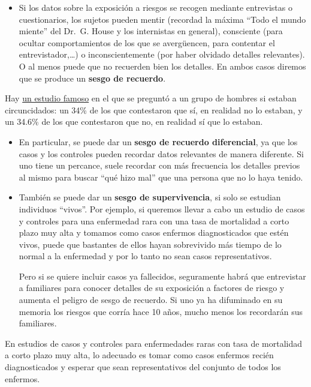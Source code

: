 \documentclass[
]{book}
\providecommand{\tightlist}{%
  \setlength{\itemsep}{0pt}\setlength{\parskip}{0pt}}
\theoremstyle{definition}
\theoremstyle{definition}
\theoremstyle{definition}
\theoremstyle{definition}
\theoremstyle{remark}
\begin{document}
\begin{itemize}
\tightlist
\item
  Si los datos sobre la exposición a riesgos se recogen mediante entrevistas o cuestionarios, los sujetos pueden mentir (recordad la máxima ``Todo el mundo miente'' del Dr.~G. House y los internistas en general), consciente (para ocultar comportamientos de los que se avergüencen, para contentar el entrevistador,\ldots) o inconscientemente (por haber olvidado detalles relevantes). O al menos puede que no recuerden bien los detalles. En ambos casos diremos que se produce un \textbf{sesgo de recuerdo}.
\end{itemize}

\begin{rmdromans}
Hay \href{https://academic.oup.com/jnci/article-abstract/21/4/713/869173}{un estudio famoso} en el que se preguntó a un grupo de hombres si estaban circuncidados: un 34\% de los que contestaron que sí, en realidad no lo estaban, y un 34.6\% de los que contestaron que no, en realidad sí que lo estaban.
\end{rmdromans}

\begin{itemize}
\item
  En particular, se puede dar un \textbf{sesgo de recuerdo diferencial}, ya que los casos y los controles pueden recordar datos relevantes de manera diferente. Si uno tiene un percance, suele recordar con más frecuencia los detalles previos al mismo para buscar ``qué hizo mal'' que una persona que no lo haya tenido.
\item
  También se puede dar un \textbf{sesgo de supervivencia}, si solo se estudian individuos ``vivos''. Por ejemplo, si queremos llevar a cabo un estudio de casos y controles para una enfermedad rara con una tasa de mortalidad a corto plazo muy alta y tomamos como casos enfermos diagnosticados que estén vivos, puede que bastantes de ellos hayan sobrevivido más tiempo de lo normal a la enfermedad y por lo tanto no sean casos representativos.

  Pero si se quiere incluir casos ya fallecidos, seguramente habrá que entrevistar a familiares para conocer detalles de su exposición a factores de riesgo y aumenta el peligro de sesgo de recuerdo. Si uno ya ha difuminado en su memoria los riesgos que corría hace 10 años, mucho menos los recordarán sus familiares.
\end{itemize}

\begin{rmdnote}
En estudios de casos y controles para enfermedades raras con tasa de mortalidad a corto plazo muy alta, lo adecuado es tomar como casos enfermos recién diagnosticados y esperar que sean representativos del conjunto de todos los enfermos.
\end{rmdnote}
\end{document}
